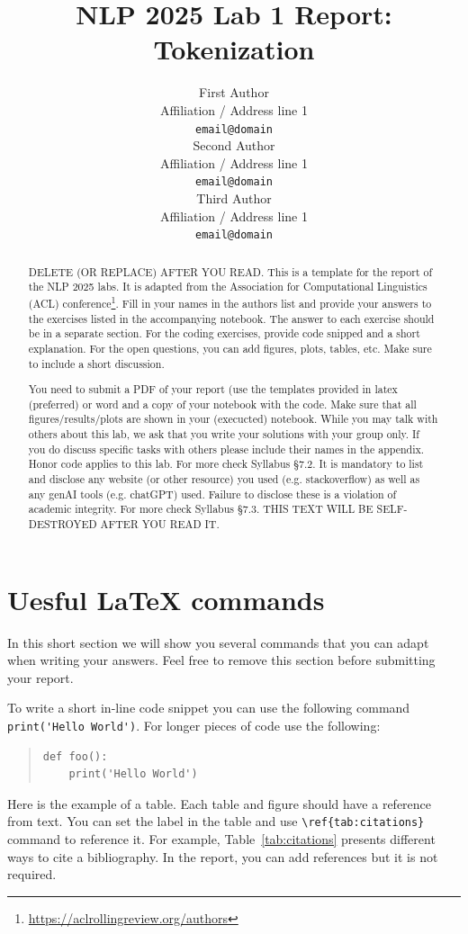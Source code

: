 \documentclass[11pt]{article}
\title{NLP 2025 Lab 1 Report: Tokenization}
\author{First Author \\
  Affiliation / Address line 1 \\
  \texttt{email@domain} \\\And
  Second Author \\
  Affiliation / Address line 1 \\
  \texttt{email@domain} \\\And
  Third Author \\
  Affiliation / Address line 1 \\
  \texttt{email@domain} \\}
\begin{document}
\maketitle
\begin{abstract}
DELETE (OR REPLACE) AFTER YOU READ. This is a template for the report of the NLP 2025 labs. It is adapted from the Association for Computational Linguistics (ACL) conference\footnote{\url{https://aclrollingreview.org/authors}}. Fill in your names in the authors list and provide your answers to the exercises listed in the accompanying notebook. The answer to each exercise should be in a separate section. For the coding exercises, provide code snipped and a short explanation. For the open questions, you can add figures, plots, tables, etc. Make sure to include a short discussion.

You need to submit a PDF of your report (use the templates provided in latex (preferred) or word and a copy of your notebook with the code. Make sure that all figures/results/plots are shown in your (execucted) notebook. While you may talk with others about this lab, we ask that you write your solutions with your group only. If you do discuss specific tasks with others please include their names in the appendix. Honor code applies to this lab. For more check Syllabus §7.2. It is mandatory to list and disclose any website (or other resource) you used (e.g. stackoverflow) as well as any genAI tools (e.g. chatGPT) used. Failure to disclose these is a violation of academic integrity. For more check Syllabus §7.3. THIS TEXT WILL BE SELF-DESTROYED AFTER YOU READ IT.
\end{abstract}

\section*{Uesful \LaTeX{} commands}
In this short section we will show you several commands that you can adapt when writing your answers. Feel free to remove this section before submitting your report.

To write a short in-line code snippet you can use the following command \verb|print('Hello World')|. For longer pieces of code use the following:
\begin{quote}
\begin{verbatim}
def foo():
    print('Hello World')
\end{verbatim}
\end{quote}

Here is the example of a table. Each table and figure should have a reference from text. You can set the label in the table and use \verb|\ref{tab:citations}| command to reference it. For example, Table~\ref{tab:citations} presents different ways to cite a bibliography. In the report, you can add references but it is not required.
\end{document}
